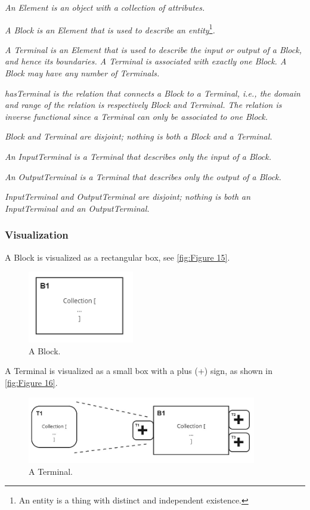 \textit{An Element is an object with a collection of attributes. }

\textit{A Block is an Element that is used to describe an entity}\footnote{{An entity is a thing with distinct
      and independent existence.}\par }\textit{.}

{\itshape
  A Terminal is an Element that is used to describe the input or output of a Block, and hence its boundaries. A Terminal
  is associated with exactly one Block. A Block may have any number of Terminals. }

{\itshape
  hasTerminal is the relation that connects a Block to a Terminal, i.e., the domain and range of the relation is
  respectively Block and Terminal. The relation is inverse functional since a Terminal can only be associated to one
  Block.}

{\itshape
  Block and Terminal are disjoint; nothing is both a Block and a Terminal.}

\textit{An InputTerminal is a Terminal that describes only the input of a Block. }

\textit{An OutputTerminal is a Terminal that describes only the output of a Block.}

{\itshape
  InputTerminal and OutputTerminal are disjoint; nothing is both an InputTerminal and an OutputTerminal.}

\subsubsection{Visualization}
A Block is visualized as a rectangular box, see \autoref{fig:Figure 15}.

\begin{figure}[htb]
  \centering
  \includegraphics[width=1.82456in,height=1.23878in]{img/ontology/element-block.png}
  \caption{A Block.}
  \label{fig:Figure 15}
\end{figure}

A Terminal is visualized as a small box with a plus (+) sign, as shown in \autoref{fig:Figure 16}.

\begin{figure}[htb]
  \centering
  \includegraphics[width=3.94162in,height=1.15217in]{img/ontology/element-terminal.jpg}
  \caption{A Terminal.}
  \label{fig:Figure 16}
\end{figure}

